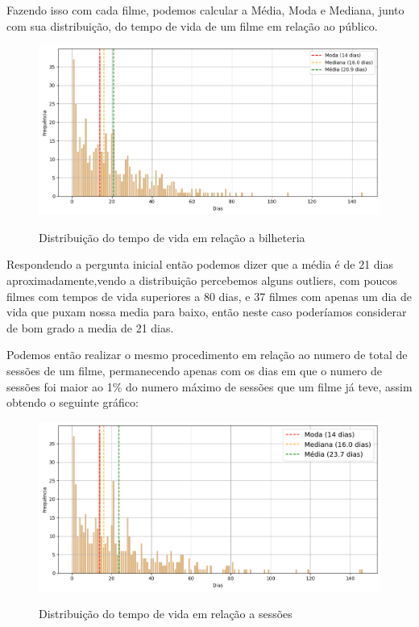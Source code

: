 \documentclass[12pt, a4paper]{article}
\begin{document}
Fazendo isso com cada filme, podemos calcular a Média, Moda e Mediana, junto com sua distribuição, do tempo de vida de um filme em relação ao público.

\begin{figure}[h]
    \centering
    \includegraphics[width=1\textwidth]{Distribuicao_do_tempo_de_vida_bilheteria.png} %
    \label{fig:distribuicao_do_tempo_de_vida_bilheteria}
    \caption{Distribuição do tempo de vida em relação a bilheteria}
\end{figure}

Respondendo a pergunta inicial então podemos dizer que a média é de 21 dias aproximadamente,vendo a distribuição percebemos alguns outliers, com poucos filmes com tempos de vida superiores a 80 dias, e 37 filmes com apenas um dia de vida que puxam nossa media para baixo, então neste caso poderíamos considerar de bom grado a media de 21 dias.

Podemos então realizar o mesmo procedimento em relação ao numero de total de sessões de um filme, permanecendo apenas com os dias em que o numero de sessões foi maior ao 1\% do numero máximo de sessões que um filme já teve, assim obtendo o seguinte gráfico:

\begin{figure}[h]
    \centering
    \includegraphics[width=1\textwidth]{Distribuicao_do_tempo_de_vida_sessoes.png} %
    \label{fig:distribuicao_do_tempo_de_vida_sessoes}
    \caption{Distribuição do tempo de vida em relação a sessões}
\end{figure}
\end{document}
